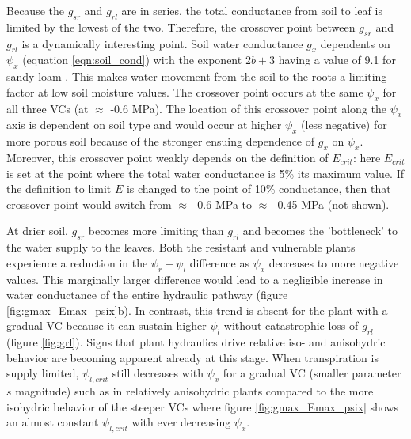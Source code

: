 \documentclass[utf8]{frontiersSCNS} %
\begin{document}
Because the $g_{sr}$ and $g_{rl}$ are in series, the total conductance from soil to leaf is limited by the lowest of the two. Therefore, the crossover point between $g_{sr}$ and $g_{rl}$ is a dynamically interesting point. Soil water conductance $g_x$ dependents on $\psi_x$ (equation \ref{eqn:soil_cond}) with the exponent $2b+3$ having a value of 9.1 for sandy loam \citep{campbell_introduction_2012}. This makes water movement from the soil to the roots a limiting factor at low soil moisture values. The crossover point occurs at the same $\psi_x$ for all three VCs (at $\approx$ -0.6 MPa). The location of this crossover point along the $\psi_x$ axis is dependent on soil type and would occur at higher $\psi_x$ (less negative) for more porous soil because of the stronger ensuing dependence of $g_x$ on $\psi_x$. Moreover, this crossover point weakly depends on the definition of $E_{crit}$: here $E_{crit}$ is set at the point where the total water conductance is 5\% its maximum value. If the definition to limit $E$ is changed to the point of 10\% conductance, then that crossover point would switch from $\approx$ -0.6 MPa to $\approx$ -0.45 MPa (not shown).

At drier soil, $g_{sr}$ becomes more limiting than $g_{rl}$ and becomes the 'bottleneck' to the water supply to the leaves. Both the resistant and vulnerable plants experience a reduction in the $\psi_r - \psi_l$ difference as $\psi_x$ decreases to more negative values. This marginally larger difference would lead to a negligible increase in water conductance of the entire hydraulic pathway (figure \ref{fig:gmax_Emax_psix}b). In contrast, this trend is absent for the plant with a gradual VC because it can sustain higher $\psi_l$ without catastrophic loss of $g_{rl}$ (figure \ref{fig:grl}). Signs that plant hydraulics drive relative iso- and anisohydric behavior are becoming apparent already at this stage. When transpiration is supply limited, $\psi_{l,crit}$ still decreases with $\psi_x$ for a gradual VC (smaller parameter $s$ magnitude) such as in relatively anisohydric plants compared to the more isohydric behavior of the steeper VCs where figure \ref{fig:gmax_Emax_psix} shows an almost constant $\psi_{l,crit}$ with ever decreasing $\psi_x$.

\end{document}
